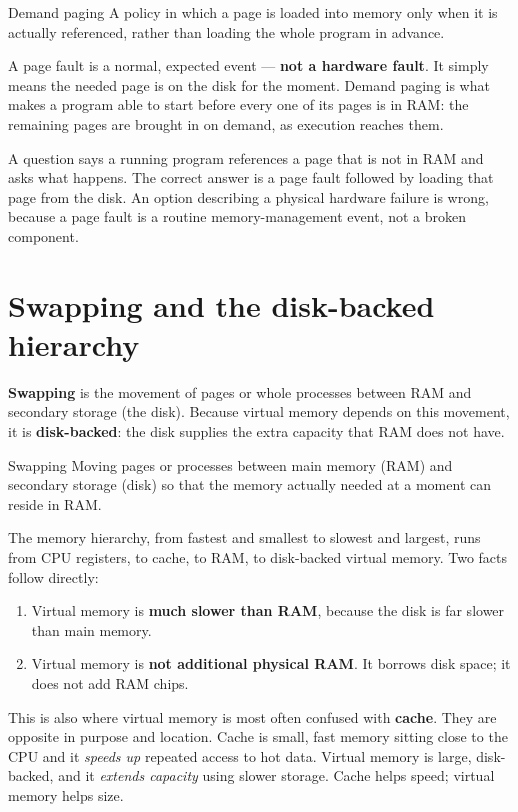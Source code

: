 \begin{definitionbox}{Demand paging}
A policy in which a page is loaded into memory only when it is actually
referenced, rather than loading the whole program in advance.
\end{definitionbox}

A page fault is a normal, expected event --- \textbf{not a hardware fault}. It
simply means the needed page is on the disk for the moment. Demand paging is
what makes a program able to start before every one of its pages is in RAM: the
remaining pages are brought in on demand, as execution reaches them.

\begin{example}
A question says a running program references a page that is not in RAM and asks
what happens. The correct answer is a page fault followed by loading that page
from the disk. An option describing a physical hardware failure is wrong,
because a page fault is a routine memory-management event, not a broken
component.
\end{example}

\section{Swapping and the disk-backed hierarchy}
\textbf{Swapping} is the movement of pages or whole processes between RAM and
secondary storage (the disk). Because virtual memory depends on this movement,
it is \textbf{disk-backed}: the disk supplies the extra capacity that RAM does
not have.

\begin{definitionbox}{Swapping}
Moving pages or processes between main memory (RAM) and secondary storage
(disk) so that the memory actually needed at a moment can reside in RAM.
\end{definitionbox}

The memory hierarchy, from fastest and smallest to slowest and largest, runs
from CPU registers, to cache, to RAM, to disk-backed virtual memory. Two facts
follow directly:
\begin{enumerate}
  \item Virtual memory is \textbf{much slower than RAM}, because the disk is far
    slower than main memory.
  \item Virtual memory is \textbf{not additional physical RAM}. It borrows disk
    space; it does not add RAM chips.
\end{enumerate}

This is also where virtual memory is most often confused with \textbf{cache}.
They are opposite in purpose and location. Cache is small, fast memory sitting
close to the CPU and it \emph{speeds up} repeated access to hot data. Virtual
memory is large, disk-backed, and it \emph{extends capacity} using slower
storage. Cache helps speed; virtual memory helps size.

